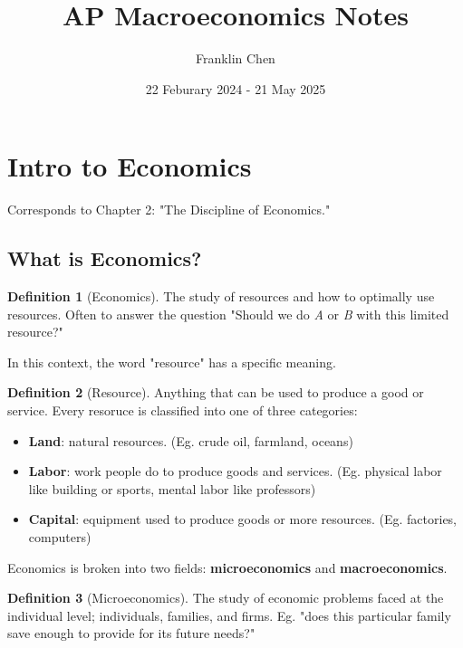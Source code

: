 \documentclass[12pt, a4paper]{article}
\title{AP Macroeconomics Notes}
\author{Franklin Chen}
\date{22 Feburary 2024 - 21 May 2025}
\theoremstyle{definition}
\newtheorem{definition}{Definition}
\begin{document}
\maketitle
\newpage

\tableofcontents

\newpage

\section{Intro to Economics}
Corresponds to Chapter 2: "The Discipline of Economics."

\subsection{What is Economics?}

\begin{definition}[Economics]
    The study of resources and how to optimally use resources.
    Often to answer the question "Should we do \textit{A} or \textit{B} with this limited resource?"
\end{definition}

In this context, the word "resource" has a specific meaning.

\begin{definition}[Resource]
    Anything that can be used to produce a good or service.
    Every resoruce is classified into one of three categories:
    \begin{itemize}
        \item \textbf{Land}: natural resources. (Eg. crude oil, farmland, oceans)
        \item \textbf{Labor}: work people do to produce goods and services. (Eg. physical labor like building or sports, mental labor like professors)
        \item \textbf{Capital}: equipment used to produce goods or more resources. (Eg. factories, computers)
    \end{itemize}
\end{definition}

Economics is broken into two fields: \textbf{microeconomics} and \textbf{macroeconomics}.

\begin{definition}[Microeconomics]
    The study of economic problems faced at the individual level; individuals, families, and firms.
    Eg. "does this particular family save enough to provide for its future needs?"
\end{definition}
\end{document}
